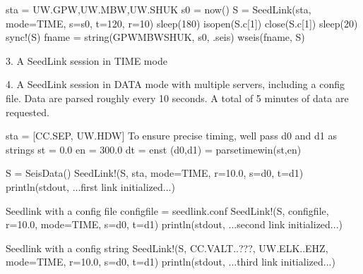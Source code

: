 \documentclass[letterpaper,11pt,english]{sphinxmanual}
\begin{document}
\begin{sphinxVerbatim}[commandchars=\\\{\}]
sta = \PYGZdq{}UW.GPW,UW.MBW,UW.SHUK\PYGZdq{}
s0 = now()
S = SeedLink(sta, mode=\PYGZdq{}TIME\PYGZdq{}, s=s0, t=120, r=10)
sleep(180)
isopen(S.c[1]) \PYGZam{}\PYGZam{} close(S.c[1])
sleep(20)
sync!(S)
fname = string(\PYGZdq{}GPW\PYGZus{}MBW\PYGZus{}SHUK\PYGZdq{}, s0, \PYGZdq{}.seis\PYGZdq{})
wseis(fname, S)
\end{sphinxVerbatim}

3. A SeedLink session in TIME mode

\begin{sphinxVerbatim}[commandchars=\\\{\}]
  
     
\end{sphinxVerbatim}

4. A SeedLink session in DATA mode with multiple servers, including a config file. Data are parsed roughly every 10 seconds. A total of 5 minutes of data are requested.

\begin{sphinxVerbatim}[commandchars=\\\{\}]
sta = [\PYGZdq{}CC.SEP\PYGZdq{}, \PYGZdq{}UW.HDW\PYGZdq{}]
\PYGZsh{} To ensure precise timing, we\PYGZsq{}ll pass d0 and d1 as strings
st = 0.0
en = 300.0
dt = en\PYGZhy{}st
(d0,d1) = parsetimewin(st,en)

S = SeisData()
SeedLink!(S, sta, mode=\PYGZdq{}TIME\PYGZdq{}, r=10.0, s=d0, t=d1)
println(stdout, \PYGZdq{}...first link initialized...\PYGZdq{})

\PYGZsh{} Seedlink with a config file
config\PYGZus{}file = \PYGZdq{}seedlink.conf\PYGZdq{}
SeedLink!(S, config\PYGZus{}file, r=10.0, mode=\PYGZdq{}TIME\PYGZdq{}, s=d0, t=d1)
println(stdout, \PYGZdq{}...second link initialized...\PYGZdq{})

\PYGZsh{} Seedlink with a config string
SeedLink!(S, \PYGZdq{}CC.VALT..???, UW.ELK..EHZ\PYGZdq{}, mode=\PYGZdq{}TIME\PYGZdq{}, r=10.0, s=d0, t=d1)
println(stdout, \PYGZdq{}...third link initialized...\PYGZdq{})
\end{sphinxVerbatim}



\renewcommand{\indexname}{Index}
\printindex
\end{document}
